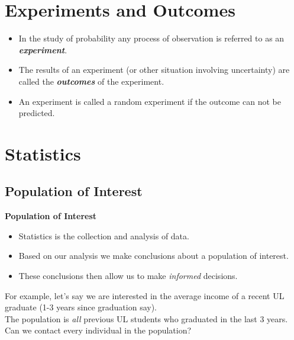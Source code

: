 \documentclass[]{report}
\begin{document}
\section{Experiments and Outcomes}


\begin{itemize}
\item In the study of probability any process of observation is referred to as an
\textit{\textbf{experiment}}.
\vspace{0.2cm}
\item The results of an experiment (or other situation involving uncertainty)
are called the \textit{\textbf{outcomes}} of the experiment.
\vspace{0.2cm}
\item An experiment is called a random experiment if the outcome can not be
predicted.
\end{itemize}

	\section{Statistics}
		\subsection{Population of Interest}
		{ \textbf{Population of Interest}}
		\begin{itemize}\itemsep0.2cm
			\item Statistics is the collection and analysis of data.
			\item Based on our analysis we make conclusions about a { population} of interest.
			\item These conclusions then allow us to make \emph{informed} decisions.\\[0.8cm]
		\end{itemize}
		For example, let's say we are interested in the average income of a recent UL graduate (1-3 years since graduation say).\\[0.5cm]
		
		The { population} is \emph{all} previous UL students who graduated in the last 3 years.\\[0.5cm]
		
		Can we contact every individual in the population?
		
		
\end{document}
